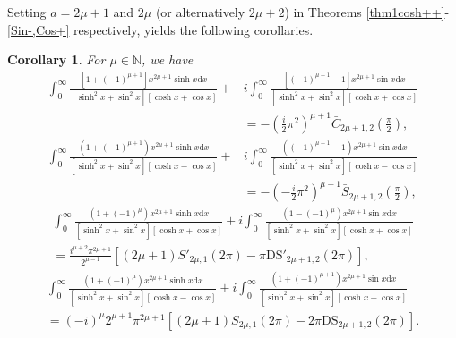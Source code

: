 \documentclass[11pt]{article}
\def\N{\mathbb{N}}
\theoremstyle{plain}
\newtheorem{cor}[thm]{Corollary}
\theoremstyle{definition}
\begin{document}
Setting $a=2\mu+1$ and $2\mu$ (or alternatively $2\mu+2$) in Theorems \ref{thm1cosh++}-\ref{Sin-,Cos+} respectively, yields the following corollaries.
\begin{cor}
	For $\mu\in \N$, we have
	\begin{align}
		\int_0^{\infty}{\frac{\left[ 1+\left( -1 \right) ^{\mu +1} \right] x^{2\mu +1}\sinh x\mathrm{d}x}{\left[ \sinh ^2x+\sin ^2x \right] \left[ \cosh x+\cos x \right]}}+&i\int_0^{\infty}{\frac{\left[ \left( -1 \right) ^{\mu +1}-1 \right] x^{2\mu +1}\sin x\mathrm{d}x}{\left[ \sinh ^2x+\sin ^2x \right] \left[ \cosh x+\cos x \right]}}
		\nonumber\\
		&=-\left( \frac{i}{2}\pi ^2 \right) ^{\mu +1} \bar{C}_{2\mu+1,2}\left( \frac{\pi}{2} \right) ,
	\end{align}
	\begin{align}
		\int_0^{\infty}{\frac{\left( 1+\left( -1 \right) ^{\mu +1} \right) x^{2\mu +1}\sinh x\mathrm{d}x}{\left[ \sinh ^2x+\sin ^2x \right] \left[ \cosh x-\cos x \right]}}+&i\int_0^{\infty}{\frac{\left( \left( -1 \right) ^{\mu +1}-1 \right) x^{2\mu +1}\sin x\mathrm{d}x}{\left[ \sinh ^2x+\sin ^2x \right] \left[ \cosh x-\cos x \right]}}
		\nonumber\\
		&=-\left( -\frac{i}{2}\pi ^2 \right) ^{\mu +1}\bar{S}_{2\mu+1,2}\left( \frac{\pi}{2} \right),
	\end{align}
	\begin{align}\label{sin+,cos-,odd}
		\int_0^{\infty}{\frac{\left( 1+\left( -1 \right) ^{\mu} \right) x^{2\mu +1}\sinh x\mathrm{d}x}{\left[ \sinh ^2x+\sin ^2x \right] \left[ \cosh x+\cos x \right]}+}i\int_0^{\infty}{\frac{\left( 1-\left( -1 \right) ^{\mu} \right) x^{2\mu +1}\sin x\mathrm{d}x}{\left[ \sinh ^2x+\sin ^2x \right] \left[ \cosh x+\cos x \right]}}
		\nonumber\\
		=
		\frac{i^{\mu +2}\pi ^{2\mu +1}}{2^{\mu -1}}\left[ \left( 2\mu +1 \right) S'_{2\mu ,1}\left( 2\pi \right) -\pi \mathrm{DS}'_{2\mu +1,2}\left( 2\pi \right) \right] ,
	\end{align}
	\begin{align}
		\int_0^{\infty}{\frac{\left( 1+\left( -1 \right) ^{\mu} \right) x^{2\mu +1}\sinh x\mathrm{d}x}{\left[ \sinh ^2x+\sin ^2x \right] \left[ \cosh x-\cos x \right]}}+i\int_0^{\infty}{\frac{\left( 1+\left( -1 \right) ^{\mu +1} \right) x^{2\mu +1}\sin x\mathrm{d}x}{\left[ \sinh ^2x+\sin ^2x \right] \left[ \cosh x-\cos x \right]}}
		\nonumber\\
		=
		\left( -i \right) ^{\mu}2^{\mu +1}\pi ^{2\mu +1}{\left[ \left( 2\mu +1 \right) S_{2\mu ,1}\left( 2\pi \right) -2\pi \mathrm{DS}_{2\mu +1,2}\left( 2\pi \right) \right]}.
	\end{align}
	
\end{cor}
\end{document}
